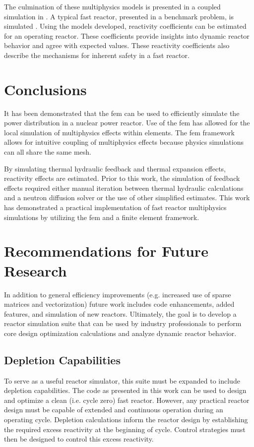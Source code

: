   The culmination of these multiphysics models is presented in a coupled
  simulation in . A typical fast reactor, presented in 
  a benchmark problem, is simulated \cite{abr}. Using the models developed, 
  reactivity coefficients can be estimated for an operating reactor. These 
  coefficients provide insights into dynamic reactor behavior and agree with 
  expected values. These reactivity coefficients also describe the mechanisms 
  for inherent safety in a fast reactor.

\section{Conclusions}
  
  It has been demonstrated that the \gls{fem} can be used to efficiently
  simulate the power distribution in a nuclear power reactor. Use of the
  \gls{fem} has allowed for the local simulation of multiphysics effects within
  elements.  The \gls{fem} framework allows for intuitive coupling of
  multiphysics effects because physics simulations can all share the same mesh.

  By simulating thermal hydraulic feedback and thermal expansion effects,
  reactivity effects are estimated. Prior to this work, the simulation of
  feedback effects required either manual iteration between thermal hydraulic
  calculations and a neutron diffusion solver or the use of other simplified
  estimates. This work has demonstrated a practical implementation of fast
  reactor multiphysics simulations by utilizing the \gls{fem} and a finite
  element framework.
  
\section{Recommendations for Future Research}

  In addition to general efficiency improvements (e.g. increased use of sparse
  matrices and vectorization) future work includes code enhancements, added 
  features, and simulation of new reactors. Ultimately, the goal is to develop a
  reactor simulation suite that can be used by industry professionals to perform 
  core design optimization calculations and analyze dynamic reactor behavior. 

  \subsection{Depletion Capabilities}
    To serve as a useful reactor simulator, this suite must be expanded to 
    include depletion capabilities. The code as presented in this work can be 
    used to design and optimize a clean (i.e. cycle zero) fast reactor. However,
    any practical reactor design must be capable of extended and continuous 
    operation during an operating cycle. Depletion calculations inform the 
    reactor design by establishing the required excess reactivity at the 
    beginning of cycle. Control strategies must then be designed to control 
    this excess reactivity. 

